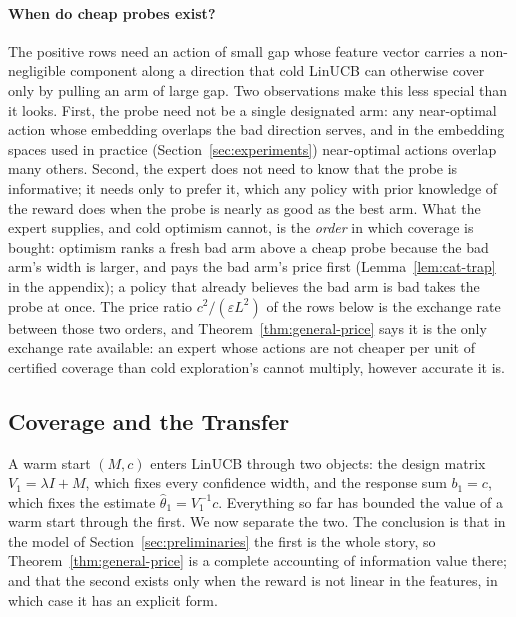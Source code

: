 \documentclass{article}
\theoremstyle{definition}
\theoremstyle{remark}
\newcommand{\eps}{\varepsilon}
\theoremstyle{remark}
\begin{document}
\paragraph{When do cheap probes exist?}
The positive rows need an action of small gap whose feature vector carries a
non-negligible component along a direction that cold LinUCB can otherwise
cover only by pulling an arm of large gap. Two observations make this less
special than it looks. First, the probe need not be a single designated arm:
any near-optimal action whose embedding overlaps the bad direction serves,
and in the embedding spaces used in practice (Section~\ref{sec:experiments})
near-optimal actions overlap many others. Second, the expert does not need to
know that the probe is informative; it needs only to prefer it, which any
policy with prior knowledge of the reward does when the probe is nearly as
good as the best arm. What the expert supplies, and cold optimism cannot, is
the \emph{order} in which coverage is bought: optimism ranks a fresh bad arm
above a cheap probe because the bad arm's width is larger, and pays the bad
arm's price first (Lemma~\ref{lem:cat-trap} in the appendix); a policy that
already believes the bad arm is bad takes the probe at once. The price ratio
$c^2/(\eps L^2)$ of the rows below is the exchange rate between those two
orders, and Theorem~\ref{thm:general-price} says it is the only exchange rate
available: an expert whose actions are not cheaper per unit of certified
coverage than cold exploration's cannot multiply, however accurate it is.

\subsection{Coverage and the Transfer}
\label{sec:two-channels}

A warm start $(M,c)$ enters LinUCB through two objects: the design matrix
$V_1=\lambda I+M$, which fixes every confidence width, and the response sum
$b_1=c$, which fixes the estimate $\widehat\theta_1=V_1^{-1}c$. Everything so
far has bounded the value of a warm start through the first. We now separate
the two. The conclusion is that in the model of
Section~\ref{sec:preliminaries} the first is the whole story, so
Theorem~\ref{thm:general-price} is a complete accounting of information value
there; and that the second exists only when the reward is not linear in the
features, in which case it has an explicit form.
\end{document}
